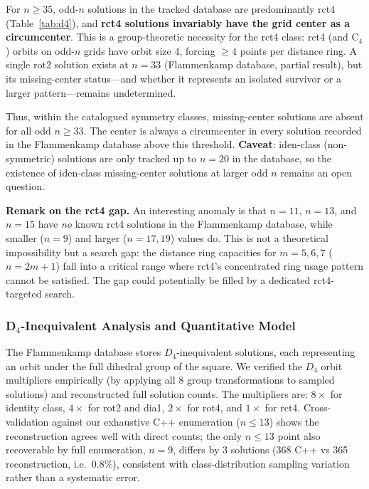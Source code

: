 \documentclass[11pt,a4paper]{article}
\theoremstyle{plain}
\theoremstyle{definition}
\begin{document}
For $n\ge 35$, odd-$n$ solutions in the tracked database are predominantly rct4 (Table~\ref{tab:d4}), and \textbf{rct4 solutions invariably have the grid center as a circumcenter}. This is a group-theoretic necessity for the rct4 class: rct4 (and C$_4$) orbits on odd-$n$ grids have orbit size 4, forcing $\ge 4$ points per distance ring. A single rot2 solution exists at $n=33$ (Flammenkamp database, partial result), but its missing-center status---and whether it represents an isolated survivor or a larger pattern---remains undetermined.

Thus, within the catalogued symmetry classes, missing-center solutions are absent for all odd $n\ge 33$. The center is always a circumcenter in every solution recorded in the Flammenkamp database above this threshold. \textbf{Caveat}: iden-class (non-symmetric) solutions are only tracked up to $n=20$ in the database, so the existence of iden-class missing-center solutions at larger odd $n$ remains an open question.

\noindent\textbf{Remark on the rct4 gap.} An interesting anomaly is that $n=11$, $n=13$, and $n=15$ have \emph{no} known rct4 solutions in the Flammenkamp database, while smaller ($n=9$) and larger ($n=17,19$) values do. This is not a theoretical impossibility but a search gap: the distance ring capacities for $m=5,6,7$ ($n=2m+1$) fall into a critical range where rct4's concentrated ring usage pattern cannot be satisfied. The gap could potentially be filled by a dedicated rct4-targeted search.

\subsubsection{D$_4$-Inequivalent Analysis and Quantitative Model}
\label{sec:regression}

The Flammenkamp database stores $D_4$-inequivalent solutions, each representing an orbit under the full dihedral group of the square. We verified the $D_4$ orbit multipliers empirically (by applying all 8 group transformations to sampled solutions) and reconstructed full solution counts. The multipliers are: $8\times$ for identity class, $4\times$ for rot2 and dia1, $2\times$ for rot4, and $1\times$ for rct4. Cross-validation against our exhaustive C++ enumeration ($n\le13$) shows the reconstruction agrees well with direct counts; the only $n\le13$ point also recoverable by full enumeration, $n=9$, differs by 3 solutions (368 C++ vs 365 reconstruction, i.e.\ $0.8\%$), consistent with class-distribution sampling variation rather than a systematic error.
\end{document}
